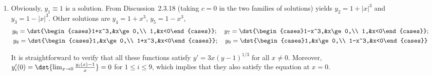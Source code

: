 \documentclass[openany]{book}
\newenvironment{sectionSolutions}{
 \begin{enumerate}[item-label={\thesection.\arabic{enumi}.}]
}{
 \end{enumerate}
}
\begin{document}
\begin{sectionSolutions}
\item
Obviously, $y_1\equiv1$ is a solution.
From Discussion~2.3.18 (taking $c=0$
in the two families of solutions) yields
$y_2=1+|x|^3$ and $y_3=1-|x|^3$. Other solutions are
$y_4=1+x^3$, $y_5=1-x^3$,
\begin{gather*}
y_6=\dst{\begin{cases}1+x^3,&x\ge 0,\\
1,&x<0\end{cases}};\quad
y_7=\dst{\begin{cases}1-x^3,&x\ge 0,\\
1,&x<0\end{cases}};
\\
y_8=\dst{\begin{cases}1,&x\ge 0,\\
1+x^3,&x<0\end{cases}};\quad
y_9=\dst{\begin{cases}1,&x\ge 0,\\
1-x^3,&x<0\end{cases}}
\end{gather*}


It is straightforward to verify that all these functions satisfy
$y'=3x(y-1)^{1/3}$  for all $x\ne0$. Moreover,
 $y_i'(0)=\dst{\lim_{x\to0}\frac{y_i(x)-1}{ x}}=0$ for
$1\le i\le 9$, which implies that they also satisfy the equation at
$x=0$.




\end{sectionSolutions}
\end{document}

